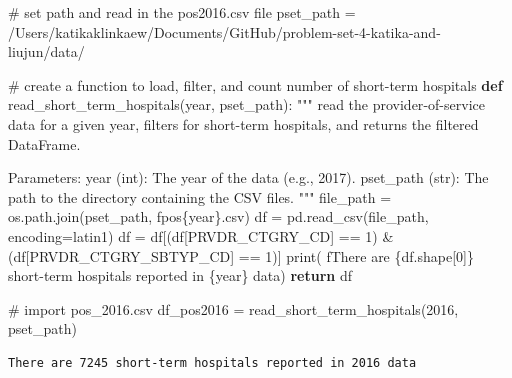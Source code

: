 \documentclass[
  letterpaper,
  DIV=11,
  numbers=noendperiod]{scrartcl}
\newenvironment{Shaded}{\begin{snugshade}}{\end{snugshade}}
\newcommand{\BuiltInTok}[1]{\textcolor[rgb]{0.00,0.23,0.31}{#1}}
\newcommand{\CommentTok}[1]{\textcolor[rgb]{0.37,0.37,0.37}{#1}}
\newcommand{\ControlFlowTok}[1]{\textcolor[rgb]{0.00,0.23,0.31}{\textbf{#1}}}
\newcommand{\DecValTok}[1]{\textcolor[rgb]{0.68,0.00,0.00}{#1}}
\newcommand{\KeywordTok}[1]{\textcolor[rgb]{0.00,0.23,0.31}{\textbf{#1}}}
\newcommand{\NormalTok}[1]{\textcolor[rgb]{0.00,0.23,0.31}{#1}}
\newcommand{\OperatorTok}[1]{\textcolor[rgb]{0.37,0.37,0.37}{#1}}
\newcommand{\SpecialCharTok}[1]{\textcolor[rgb]{0.37,0.37,0.37}{#1}}
\newcommand{\SpecialStringTok}[1]{\textcolor[rgb]{0.13,0.47,0.30}{#1}}
\newcommand{\StringTok}[1]{\textcolor[rgb]{0.13,0.47,0.30}{#1}}
\begin{document}
\begin{Shaded}
\begin{Highlighting}[]
\CommentTok{\# set path and read in the pos2016.csv file}
\NormalTok{pset\_path }\OperatorTok{=} \StringTok{\textquotesingle{}/Users/katikaklinkaew/Documents/GitHub/problem{-}set{-}4{-}katika{-}and{-}liujun/data/\textquotesingle{}}

\CommentTok{\# create a function to load, filter, and count number of short{-}term hospitals}
\KeywordTok{def}\NormalTok{ read\_short\_term\_hospitals(year, pset\_path):}
    \CommentTok{"""}
\CommentTok{    read the provider{-}of{-}service data for a given year, filters for short{-}term hospitals,}
\CommentTok{    and returns the filtered DataFrame.}

\CommentTok{    Parameters:}
\CommentTok{        year (int): The year of the data (e.g., 2017).}
\CommentTok{        pset\_path (str): The path to the directory containing the CSV files.}
\CommentTok{    """}
\NormalTok{    file\_path }\OperatorTok{=}\NormalTok{ os.path.join(pset\_path, }\SpecialStringTok{f\textquotesingle{}pos}\SpecialCharTok{\{}\NormalTok{year}\SpecialCharTok{\}}\SpecialStringTok{.csv\textquotesingle{}}\NormalTok{)}
\NormalTok{    df }\OperatorTok{=}\NormalTok{ pd.read\_csv(file\_path, encoding}\OperatorTok{=}\StringTok{\textquotesingle{}latin1\textquotesingle{}}\NormalTok{)}
\NormalTok{    df }\OperatorTok{=}\NormalTok{ df[(df[}\StringTok{\textquotesingle{}PRVDR\_CTGRY\_CD\textquotesingle{}}\NormalTok{] }\OperatorTok{==} \DecValTok{1}\NormalTok{) }\OperatorTok{\&}\NormalTok{ (df[}\StringTok{\textquotesingle{}PRVDR\_CTGRY\_SBTYP\_CD\textquotesingle{}}\NormalTok{] }\OperatorTok{==} \DecValTok{1}\NormalTok{)]}
    \BuiltInTok{print}\NormalTok{(}
        \SpecialStringTok{f\textquotesingle{}There are }\SpecialCharTok{\{}\NormalTok{df}\SpecialCharTok{.}\NormalTok{shape[}\DecValTok{0}\NormalTok{]}\SpecialCharTok{\}}\SpecialStringTok{ short{-}term hospitals reported in }\SpecialCharTok{\{}\NormalTok{year}\SpecialCharTok{\}}\SpecialStringTok{ data\textquotesingle{}}\NormalTok{)}
    \ControlFlowTok{return}\NormalTok{ df}

\CommentTok{\# import pos\_2016.csv}
\NormalTok{df\_pos2016 }\OperatorTok{=}\NormalTok{ read\_short\_term\_hospitals(}\DecValTok{2016}\NormalTok{, pset\_path)}
\end{Highlighting}
\end{Shaded}

\begin{verbatim}
There are 7245 short-term hospitals reported in 2016 data
\end{verbatim}
\end{document}
